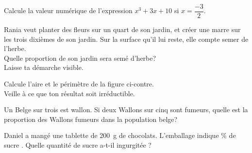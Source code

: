 \documentclass[../../syllabus_2.tex]{subfiles}
\begin{document}
\begin{exercise}
  Calcule la valeur numérique de l'expression $x^3+3x+10$ si $x=\dfrac{-3}{2}$.
\end{exercise}

\begin{exercise}
  Rania veut planter des fleurs sur un quart de son jardin, et créer une marre sur les trois dixièmes de son jardin. Sur la surface qu'il lui reste, elle compte semer de l'herbe. \\
  Quelle proportion de son jardin sera semé d'herbe?  \\ Laisse ta démarche visible.
\end{exercise}

\begin{exercise}
  Calcule l'aire et le périmètre de la figure ci-contre. \\
  Veille à ce que ton résultat soit irréductible.
\begin{center}
  
\end{center}
\end{exercise}

\begin{exercise}
  Un Belge sur trois est wallon. Si deux Wallons sur cinq sont fumeurs, quelle est la proportion des Wallons fumeurs dans la population belge? 
\end{exercise}

\begin{exercise}
  Daniel a mangé une tablette de \SI{200}{g} de chocolats. L'emballage indique  \% de sucre \fg. Quelle quantité de sucre a-t-il ingurgitée ?
\end{exercise}
\end{document}
